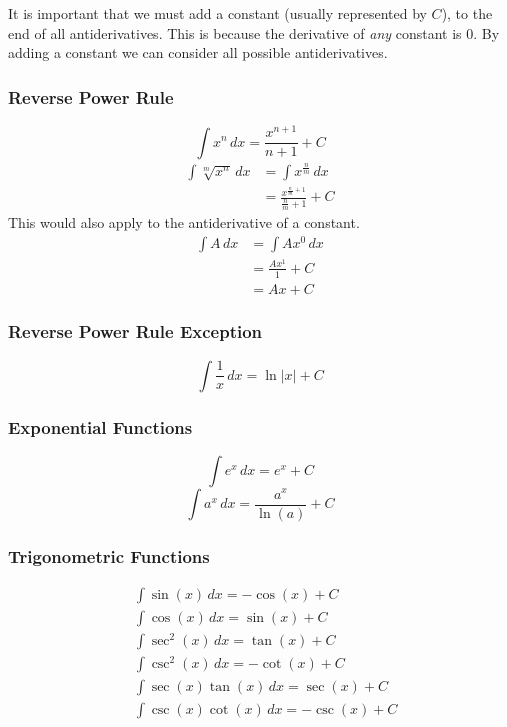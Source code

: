 \documentclass[12pt]{article}
\begin{document}
            It is important that we must add a constant (usually represented by $C$), to the end of all antiderivatives. This is because the derivative of \textit{any} constant is $0$. By adding a constant we can consider all possible antiderivatives. %

            \subsubsection{Reverse Power Rule}
                \[ \int x^n \, dx = \frac{x^{n+1}}{n+1} + C\]
                \begin{align*}
                    \int \sqrt[m]{x^n} \, dx &= \int x^{\frac{n}{m}} \, dx \\[6pt]
                    &= \frac{x^{\frac{n}{m} + 1}}{\frac{n}{m} + 1} + C
                \end{align*}
                \newline
                This would also apply to the antiderivative of a constant.
                \begin{align*}
                    \int A \, dx &= \int Ax^0 \, dx \\
                    &= \frac{Ax^1}{1} + C\\[6pt]
                    &= Ax + C
                \end{align*}

            \subsubsection{Reverse Power Rule Exception}
                \[ \int \frac{1}{x} \, dx = \ln |x| + C\]

            \subsubsection{Exponential Functions}
                \[ \int e^x \, dx = e^x + C \]
                \[ \int a^x \, dx = \frac{a^x}{\ln(a)} + C \]

            \subsubsection{Trigonometric Functions}
                \begin{align*}
                    &\int \sin(x) \, dx = -\cos(x) + C \\[6pt]
                    &\int \cos(x) \, dx = \sin(x) + C \\[6pt]
                    &\int \sec^2(x) \, dx = \tan(x) + C \\[6pt]
                    &\int \csc^2(x) \, dx = -\cot(x) + C \\[6pt]
                    &\int \sec(x)\tan(x) \, dx = \sec(x) + C \\[6pt]
                    &\int \csc(x)\cot(x) \, dx = -\csc(x) + C
                \end{align*}
\end{document}
